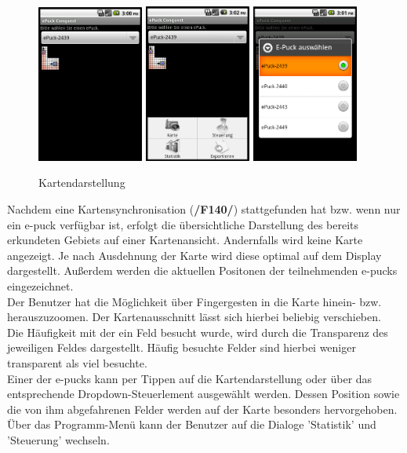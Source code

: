 \documentclass[10pt,a4paper]{article}
\begin{document}
			\begin{figure}[h]
				  \centering
				\includegraphics[width=3.5cm]{images/map.png}
				\includegraphics[width=3.5cm]{images/map_menu.png}
				\includegraphics[width=3.5cm]{images/map_auswahl.png}
  				\caption{Kartendarstellung}
  			\end{figure}						
			
			Nachdem eine Kartensynchronisation (\textbf{/F140/}) stattgefunden hat bzw. wenn nur ein e-puck verfügbar ist, erfolgt die
			übersichtliche Darstellung des bereits erkundeten Gebiets auf einer Kartenansicht. Andernfalls wird keine Karte angezeigt.
			Je nach Ausdehnung der Karte wird diese optimal auf dem Display dargestellt. Außerdem werden die aktuellen Positonen der
			teilnehmenden e-pucks eingezeichnet. \\	
			Der Benutzer hat die Möglichkeit über Fingergesten in die Karte hinein- bzw. herauszuzoomen. Der Kartenausschnitt lässt sich
			hierbei beliebig verschieben. \\		
			Die Häufigkeit mit der ein Feld besucht wurde, wird durch die Transparenz des jeweiligen Feldes dargestellt. Häufig besuchte
			Felder sind hierbei weniger transparent als viel besuchte. \\
			Einer der e-pucks kann per Tippen auf die Kartendarstellung oder über das entsprechende Dropdown-Steuerlement ausgewählt
			werden. Dessen Position sowie die von ihm abgefahrenen Felder werden auf der Karte besonders hervorgehoben.\\
			Über das Programm-Menü kann der Benutzer auf die Dialoge 'Statistik' und 'Steuerung' wechseln.
\end{document}

